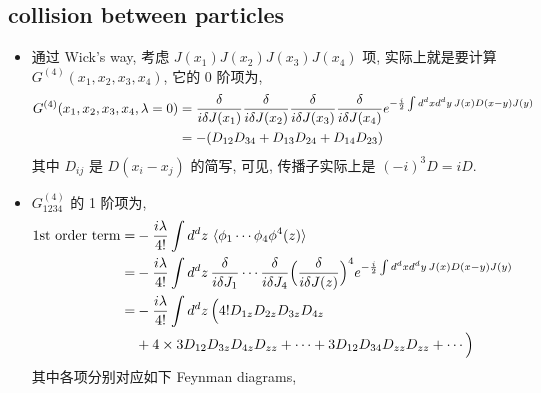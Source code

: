 \subsection{collision between particles}
\begin{itemize}
	\item 通过 Wick's way, 考虑 $J(x_1) J(x_2) J(x_3) J(x_4)$ 项, 实际上就是要计算 $G^{(4)}(x_1, x_2, x_3, x_4)$, 它的 0 阶项为,
	\begin{align}
		G^{(4)}(x_1, x_2, x_3, x_4, \lambda = 0) &= \frac{\delta}{i \delta J(x_1)} \frac{\delta}{i \delta J(x_2)} \frac{\delta}{i \delta J(x_3)} \frac{\delta}{i \delta J(x_4)} e^{- \frac{i}{2} \int d^d x d^d y \, J(x) D(x - y) J(y)} \notag \\
		&= - (D_{1 2} D_{3 4} + D_{1 3} D_{2 4} + D_{1 4} D_{2 3})
	\end{align}
	其中 $D_{i j}$ 是 $D(x_i - x_j)$ 的简写, 可见, 传播子实际上是 $(- i)^3 D = i D$.
	
	\item $G^{(4)}_{1 2 3 4}$ 的 1 阶项为,
	\begin{align}
		\text{1st order term} =& - \frac{i \lambda}{4!} \int d^d z \, \braket{\phi_1 \cdots \phi_4 \phi^4(z)} \notag \\
		=& - \frac{i \lambda}{4!} \int d^d z \, \frac{\delta}{i \delta J_1} \cdots \frac{\delta}{i \delta J_4} \Big( \frac{\delta}{i \delta J(z)} \Big)^4 e^{- \frac{i}{2} \int d^d x d^d y \, J(x) D(x - y) J(y)} \notag \\
		=& - \frac{i \lambda}{4!} \int d^d z \, \Big( 4! D_{1 z} D_{2 z} D_{3 z} D_{4 z} \notag \\
		& + 4 \times 3 D_{1 2} D_{3 z} D_{4 z} D_{z z} + \cdots + 3 D_{1 2} D_{3 4} D_{z z} D_{z z} + \cdots \Big)
	\end{align}
	其中各项分别对应如下 Feynman diagrams,
	

\end{itemize}
